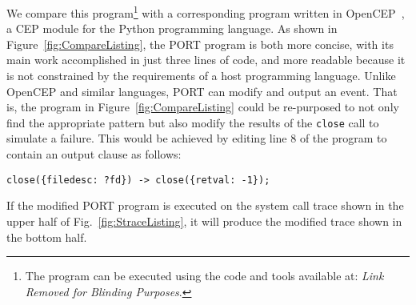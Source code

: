 We compare this program\footnote{The program can be executed using the code and tools available at: \textit{Link Removed for Blinding Purposes}.}
with a corresponding program written in OpenCEP~\cite{open_cep_website},
a CEP module for the Python programming language.
As shown in Figure~\ref{fig:CompareListing},
the PORT program is both more concise, with its main work accomplished in just
three lines of code, and more readable because it is not constrained by the
requirements of a host programming language.
Unlike  OpenCEP and similar languages, PORT can modify and output an event.
That is, the program in Figure~\ref{fig:CompareListing} could be
re-purposed to not only find the appropriate pattern but also modify the
results of the {\tt close} call to simulate a failure.
This would be achieved
by editing line 8 of the program to contain an output
clause as follows:
\begin{lstlisting}[numbers=none,xleftmargin=0em,gobble=2,columns=strict]
  close({filedesc: ?fd}) -> close({retval: -1});
\end{lstlisting}
If the modified PORT program is executed on the system call trace shown in the upper half of Fig.~\ref{fig:StraceListing}, it will produce the modified trace shown in the bottom half.






